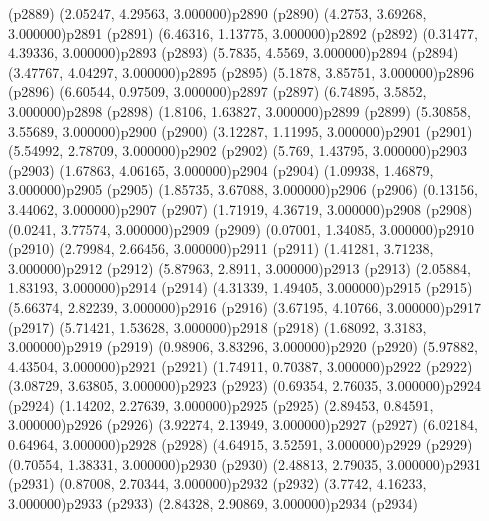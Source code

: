 \psdot(p2889)
\psPoint(2.05247, 4.29563, 3.000000){p2890}
\psdot(p2890)
\psPoint(4.2753, 3.69268, 3.000000){p2891}
\psdot(p2891)
\psPoint(6.46316, 1.13775, 3.000000){p2892}
\psdot(p2892)
\psPoint(0.31477, 4.39336, 3.000000){p2893}
\psdot(p2893)
\psPoint(5.7835, 4.5569, 3.000000){p2894}
\psdot(p2894)
\psPoint(3.47767, 4.04297, 3.000000){p2895}
\psdot(p2895)
\psPoint(5.1878, 3.85751, 3.000000){p2896}
\psdot(p2896)
\psPoint(6.60544, 0.97509, 3.000000){p2897}
\psdot(p2897)
\psPoint(6.74895, 3.5852, 3.000000){p2898}
\psdot(p2898)
\psPoint(1.8106, 1.63827, 3.000000){p2899}
\psdot(p2899)
\psPoint(5.30858, 3.55689, 3.000000){p2900}
\psdot(p2900)
\psPoint(3.12287, 1.11995, 3.000000){p2901}
\psdot(p2901)
\psPoint(5.54992, 2.78709, 3.000000){p2902}
\psdot(p2902)
\psPoint(5.769, 1.43795, 3.000000){p2903}
\psdot(p2903)
\psPoint(1.67863, 4.06165, 3.000000){p2904}
\psdot(p2904)
\psPoint(1.09938, 1.46879, 3.000000){p2905}
\psdot(p2905)
\psPoint(1.85735, 3.67088, 3.000000){p2906}
\psdot(p2906)
\psPoint(0.13156, 3.44062, 3.000000){p2907}
\psdot(p2907)
\psPoint(1.71919, 4.36719, 3.000000){p2908}
\psdot(p2908)
\psPoint(0.0241, 3.77574, 3.000000){p2909}
\psdot(p2909)
\psPoint(0.07001, 1.34085, 3.000000){p2910}
\psdot(p2910)
\psPoint(2.79984, 2.66456, 3.000000){p2911}
\psdot(p2911)
\psPoint(1.41281, 3.71238, 3.000000){p2912}
\psdot(p2912)
\psPoint(5.87963, 2.8911, 3.000000){p2913}
\psdot(p2913)
\psPoint(2.05884, 1.83193, 3.000000){p2914}
\psdot(p2914)
\psPoint(4.31339, 1.49405, 3.000000){p2915}
\psdot(p2915)
\psPoint(5.66374, 2.82239, 3.000000){p2916}
\psdot(p2916)
\psPoint(3.67195, 4.10766, 3.000000){p2917}
\psdot(p2917)
\psPoint(5.71421, 1.53628, 3.000000){p2918}
\psdot(p2918)
\psPoint(1.68092, 3.3183, 3.000000){p2919}
\psdot(p2919)
\psPoint(0.98906, 3.83296, 3.000000){p2920}
\psdot(p2920)
\psPoint(5.97882, 4.43504, 3.000000){p2921}
\psdot(p2921)
\psPoint(1.74911, 0.70387, 3.000000){p2922}
\psdot(p2922)
\psPoint(3.08729, 3.63805, 3.000000){p2923}
\psdot(p2923)
\psPoint(0.69354, 2.76035, 3.000000){p2924}
\psdot(p2924)
\psPoint(1.14202, 2.27639, 3.000000){p2925}
\psdot(p2925)
\psPoint(2.89453, 0.84591, 3.000000){p2926}
\psdot(p2926)
\psPoint(3.92274, 2.13949, 3.000000){p2927}
\psdot(p2927)
\psPoint(6.02184, 0.64964, 3.000000){p2928}
\psdot(p2928)
\psPoint(4.64915, 3.52591, 3.000000){p2929}
\psdot(p2929)
\psPoint(0.70554, 1.38331, 3.000000){p2930}
\psdot(p2930)
\psPoint(2.48813, 2.79035, 3.000000){p2931}
\psdot(p2931)
\psPoint(0.87008, 2.70344, 3.000000){p2932}
\psdot(p2932)
\psPoint(3.7742, 4.16233, 3.000000){p2933}
\psdot(p2933)
\psPoint(2.84328, 2.90869, 3.000000){p2934}
\psdot(p2934)
